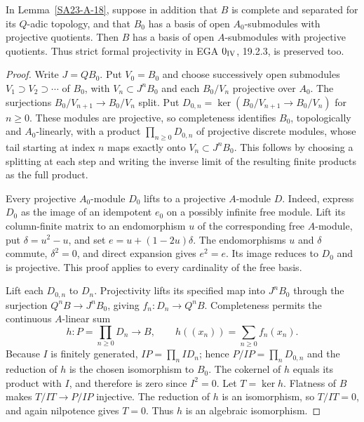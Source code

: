 \begin{lemma}
\label{SA23-A-19}
In Lemma~\ref{SA23-A-18}, suppose in addition that $B$ is complete
and separated for its $Q$-adic topology, and that $B_0$ has a
basis of open $A_0$-submodules with projective quotients. Then
$B$ has a basis of open $A$-submodules with projective quotients.
Thus strict formal projectivity in EGA $0_{\rm IV}$, 19.2.3,
is preserved too.
\end{lemma}
\begin{proof}
Write $J=QB_0$. Put $V_0=B_0$ and choose successively open submodules
$V_1\supset V_2\supset\cdots$ of $B_0$, with
$V_n\subset J^nB_0$ and each $B_0/V_n$ projective over $A_0$.
The surjections $B_0/V_{n+1}\to B_0/V_n$ split. Put
$D_{0,n}=\ker(B_0/V_{n+1}\to B_0/V_n)$ for $n\geq0$.
These modules are projective, so completeness identifies $B_0$, topologically
and $A_0$-linearly, with a product
$\prod_{n\geq0}D_{0,n}$ of projective discrete modules, whose
tail starting at index $n$ maps exactly onto $V_n\subset J^nB_0$.
This follows by
choosing a splitting at each step and writing the inverse limit
of the resulting finite products as the full product.

Every projective $A_0$-module $D_0$ lifts to a projective
$A$-module $D$. Indeed, express $D_0$ as the image of an
idempotent $e_0$ on a possibly infinite free module. Lift its
column-finite matrix to an endomorphism $u$ of the corresponding
free $A$-module, put $\delta=u^2-u$, and set
$e=u+(1-2u)\delta$. The endomorphisms $u$ and $\delta$ commute,
$\delta^2=0$, and direct expansion gives $e^2=e$. Its image
reduces to $D_0$ and is projective. This proof applies to every
cardinality of the free basis.

Lift each $D_{0,n}$ to $D_n$. Projectivity lifts its specified
map into $J^nB_0$ through the surjection $Q^nB\to J^nB_0$,
giving $f_n:D_n\to Q^nB$. Completeness permits the continuous
$A$-linear sum
\[
 h:P=\prod_{n\geq0}D_n\longrightarrow B,
 \qquad h((x_n))=\sum_{n\geq0}f_n(x_n).
\]
Because $I$ is finitely generated,
$IP=\prod_n ID_n$; hence $P/IP=\prod_nD_{0,n}$ and the
reduction of $h$ is the chosen isomorphism to $B_0$. The cokernel
of $h$ equals its product with $I$, and therefore is zero since
$I^2=0$. Let $T=\ker h$. Flatness of $B$ makes
$T/IT\to P/IP$ injective. The reduction of $h$ is an
isomorphism, so $T/IT=0$, and again nilpotence gives $T=0$.
Thus $h$ is an algebraic isomorphism.


\end{proof}
